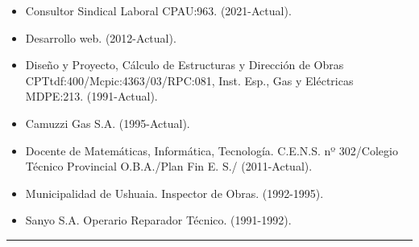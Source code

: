 \documentclass[a4paper,oneside,10pt]{article}
\begin{document}
\begin{multicols}{2} 
\begin{itemize}
    \item Consultor Sindical Laboral CPAU:963. (2021-Actual).
    \item Desarrollo web. (2012-Actual).
    \item Diseño y Proyecto, Cálculo de Estructuras y Dirección de Obras CPTtdf:400/Mcpic:4363/03/RPC:081, Inst. Esp., Gas y Eléctricas MDPE:213. (1991-Actual).
    \item Camuzzi Gas S.A. (1995-Actual).
    \item Docente de Matemáticas, Informática, Tecnología. C.E.N.S. nº 302/Colegio Técnico Provincial O.B.A./Plan Fin E. S./ (2011-Actual).
    \item Municipalidad de Ushuaia. Inspector de Obras. (1992-1995).
    \item Sanyo S.A. Operario Reparador Técnico. (1991-1992).
\end{itemize}
\end{multicols}
\hrule
\end{document}
